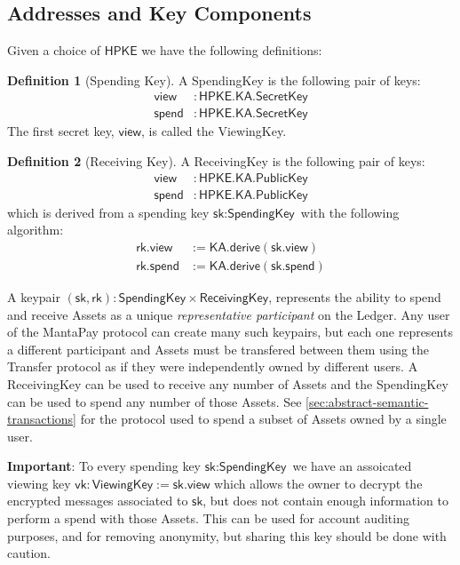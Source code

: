 \documentclass[a4paper]{article}
\newcommand{\lsubsection}[2]{\def\sectionlabel{#2} \subsection{#1}\label{sec:#2}}
\theoremstyle{definition}
\newtheorem{definition}{Definition}[subsection]
\newcommand{\Asset}{{\textsf{Asset}}}
\newcommand{\HPKE}{{\textsf{HPKE}}}
\newcommand{\KA}{{\textsf{KA}}}
\newcommand{\Ledger}{{\textsf{Ledger}}}
\newcommand{\MantaPay}{{\textsf{MantaPay}}}
\newcommand{\PublicKey}{{\textsf{PublicKey}}}
\newcommand{\ReceivingKey}{{\textsf{ReceivingKey}}}
\newcommand{\SecretKey}{{\textsf{SecretKey}}}
\newcommand{\SpendingKey}{{\textsf{SpendingKey}}}
\newcommand{\Transfer}{{\textsf{Transfer}}}
\newcommand{\ViewingKey}{{\textsf{ViewingKey}}}
\newcommand{\derive}{{\textsf{derive}}}
\newcommand{\rk}{{\textsf{rk}}}
\newcommand{\sk}{{\textsf{sk}}}
\newcommand{\spend}{{\textsf{spend}}}
\newcommand{\view}{{\textsf{view}}}
\newcommand{\vk}{{\textsf{vk}}}
\begin{document}
\lsubsection{Addresses and Key Components}{addresses-and-key-components}

Given a choice of $\HPKE$ we have the following definitions:

\begin{definition}[Spending Key]
    A \SpendingKey{} is the following pair of keys:
    \begin{align*}
        \view  &: \HPKE.\KA.\SecretKey \\
        \spend &: \HPKE.\KA.\SecretKey
    \end{align*}
    The first secret key, $\view$, is called the \ViewingKey{}.
\end{definition}

\begin{definition}[Receiving Key]
    A \ReceivingKey{} is the following pair of keys:
    \begin{align*}
        \view  &: \HPKE.\KA.\PublicKey \\
        \spend &: \HPKE.\KA.\PublicKey
    \end{align*}
    which is derived from a spending key $\sk : \SpendingKey$ with the following algorithm:
    \begin{align*}
        \rk.\view  &:= \KA.\derive(\sk.\view) \\
        \rk.\spend &:= \KA.\derive(\sk.\spend)
    \end{align*}
\end{definition}

A keypair $(\sk, \rk) : \SpendingKey \times \ReceivingKey$, represents the ability to spend and receive \Asset{s} as a unique \emph{representative participant} on the \Ledger. Any user of the \MantaPay{} protocol can create many such keypairs, but each one represents a different participant and \Asset{s} must be transfered between them using the \Transfer{} protocol as if they were independently owned by different users. A \ReceivingKey{} can be used to receive any number of \Asset{s} and the \SpendingKey{} can be used to spend any number of those \Asset{s}. See \autoref{sec:abstract-semantic-transactions} for the protocol used to spend a subset of \Asset{s} owned by a single user.

\textbf{Important}: To every spending key $\sk : \SpendingKey$ we have an assoicated viewing key $\vk : \ViewingKey := \sk.\view$ which allows the owner to decrypt the encrypted messages associated to $\sk$, but does not contain enough information to perform a spend with those \Asset{s}. This can be used for account auditing purposes, and for removing anonymity, but sharing this key should be done with caution.
\end{document}
